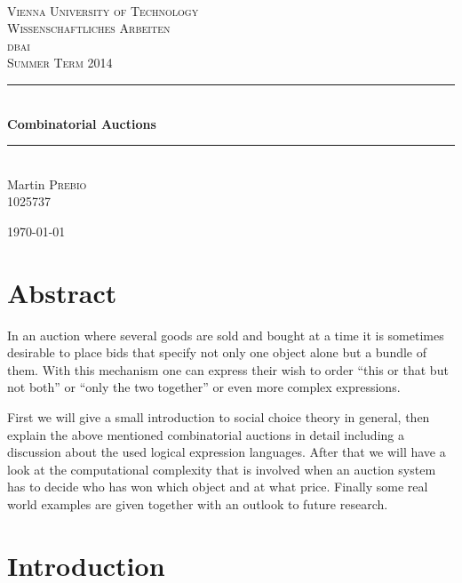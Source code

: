 \documentclass[a4paper]{paper}
\begin{document}

\nocite{*}

\newcommand{\HRule}{\rule{\linewidth}{0.5mm}}


\begin{titlepage}
\begin{center}

\textsc{\\[3.0cm]\LARGE Vienna University of Technology }\\[1.5cm]

\textsc{\Large Wissenschaftliches Arbeiten \\[0cm] dbai \\[0.3cm] Summer Term 2014}\\[0.5cm]

\HRule \\[0.4cm]
{ \huge \bfseries Combinatorial Auctions\\[0.4cm] }

\HRule \\[1.5cm]

\large
Martin \textsc{Prebio}\\1025737
\vfill

{\large \today}

\end{center}
\end{titlepage}
\restoregeometry

\section*{Abstract}
In an auction where several goods are sold and bought at a time it is sometimes desirable to place bids that specify not only one object alone but a bundle of them. With this mechanism one can express their wish to order ``this or that but not both'' or ``only the two together'' or even more complex expressions.

First we will give a small introduction to social choice theory in general, then explain the above mentioned combinatorial auctions in detail including a discussion about the used logical expression languages. After that we will have a look at the computational complexity that is involved when an auction system has to decide who has won which object and at what price. Finally some real world examples are given together with an outlook to future research.

\newpage

\section{Introduction}
\end{document}

